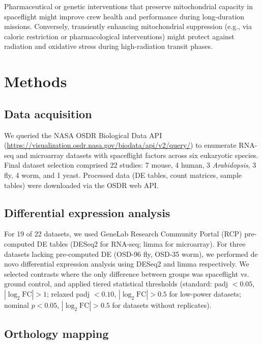 \documentclass[11pt,a4paper]{article}
\begin{document}
Pharmaceutical or genetic interventions that preserve mitochondrial capacity in 
spaceflight might improve crew health and performance during long-duration missions. 
Conversely, transiently enhancing mitochondrial suppression (e.g., via caloric 
restriction or pharmacological interventions) might protect against radiation and 
oxidative stress during high-radiation transit phases.

\section{Methods}
\label{sec:methods}

\subsection{Data acquisition}
\label{sec:methods:acquisition}

We queried the NASA OSDR Biological Data API 
(\url{https://visualization.osdr.nasa.gov/biodata/api/v2/query/}) to enumerate 
RNA-seq and microarray datasets with spaceflight factors across six eukaryotic 
species. Final dataset selection comprised 22 studies: 7 mouse, 4 human, 3 
\textit{Arabidopsis}, 3 fly, 4 worm, and 1 yeast. Processed data (DE tables, 
count matrices, sample tables) were downloaded via the OSDR web API.

\subsection{Differential expression analysis}
\label{sec:methods:de}

For 19 of 22 datasets, we used GeneLab Research Community Portal (RCP) pre-computed 
DE tables (DESeq2 for RNA-seq; limma for microarray). For three datasets lacking 
pre-computed DE (OSD-96 fly, OSD-35 worm), we performed de novo differential expression 
analysis using DESeq2 and limma respectively. We selected contrasts where the only 
difference between groups was spaceflight vs. ground control, and applied tiered 
statistical thresholds (standard: padj $< 0.05$, $|\log_2\text{FC}| > 1$; relaxed 
padj $< 0.10$, $|\log_2\text{FC}| > 0.5$ for low-power datasets; nominal $p < 0.05$, 
$|\log_2\text{FC}| > 0.5$ for datasets without replicates).

\subsection{Orthology mapping}
\label{sec:methods:orthology}
\end{document}
